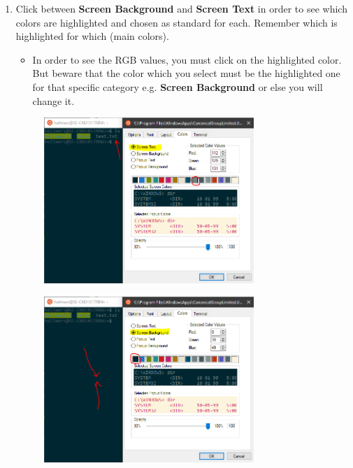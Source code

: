 \begin{enumerate}[a)]
\begin{enumerate}[1.]
        \item Click between \textbf{Screen Background} and \textbf{Screen Text} in order to see which colors are highlighted and chosen as standard for each. Remember which is highlighted for which (main colors).
        \begin{itemize}
            \item In order to see the RGB values, you must click on the highlighted color. But beware that the color which you select must be the highlighted one for that specific category e.g. \textbf{Screen Background} or else you will change it.
        \end{itemize}
        \begin{figure}[H]
            \centering
            \includegraphics[width=0.75\textwidth]{tex/WSL/Ubuntu_terminal_colors/Figures/2.PNG}
        \end{figure}
        \begin{figure}[H]
            \centering
            \includegraphics[width=0.75\textwidth]{tex/WSL/Ubuntu_terminal_colors/Figures/3.PNG}
        \end{figure}
        

\end{enumerate}
\end{enumerate}
